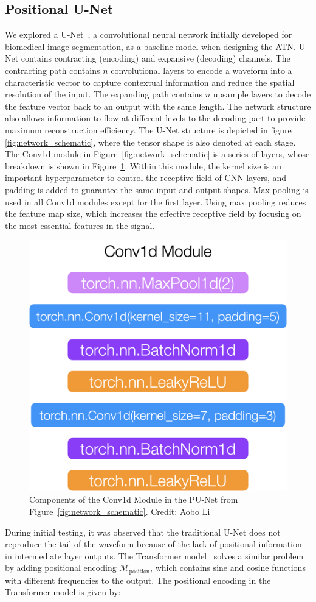 

\subsection{Positional U-Net}
We explored a U-Net~\cite{UNet}, a convolutional neural network initially developed for biomedical image segmentation, as a baseline model when designing the ATN. U-Net contains contracting (encoding) and expansive (decoding) channels. The contracting path contains $n$ convolutional layers to encode a waveform into a characteristic vector to capture contextual information and reduce the spatial resolution of the input. The expanding path contains $n$ upsample layers to decode the feature vector back to an output with the same length. The network structure also allows information to flow at different levels to the decoding part to provide maximum reconstruction efficiency. The U-Net structure is depicted in figure \ref{fig:network_schematic}, where the tensor shape is also denoted at each stage. The Conv1d module in Figure~\ref{fig:network_schematic} is a series of layers, whose breakdown is shown in Figure~\ref{ch6:fig:cov1d_break_down}. Within this module, the kernel size is an important hyperparameter to control the receptive field of CNN layers, and padding is added to guarantee the same input and output shapes. Max pooling is used in all Conv1d modules except for the first layer. Using max pooling reduces the feature map size, which increases the effective receptive field by focusing on the most essential features in the signal.

\begin{figure}[htb!]
    \centering
    \includegraphics[width=0.3\linewidth,trim={0pc 0pc 0pc 0pc},clip]{ch6/figs/conv1d.png}
    \caption{Components of the Conv1d Module in the PU-Net from Figure~\ref{fig:network_schematic}.  Credit: Aobo Li}
    \label{ch6:fig:cov1d_break_down}
\end{figure}

During initial testing, it was observed that the traditional U-Net does not reproduce the tail of the waveform because of the lack of positional information in intermediate layer outputs. The Transformer model~\cite{Transformer} solves a similar problem by adding positional encoding $\mathcal{M}_{\mathrm{position}}$, which contains sine and cosine functions with different frequencies to the output. The positional encoding in the Transformer model is given by:

